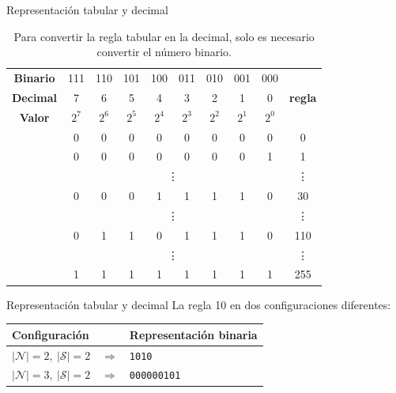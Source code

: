 \begin{frame}{Representación tabular y decimal}
	
	
	\begin{table}
		
		\centering
		
		\begin{tabular}{c | c c c c c c c c | c} 
			
			\textbf{Binario} &111 & 110 & 101 & 100 & 011 & 010 & 001 & 000 & \multirow{3}{*}{\textbf{regla}} \\ 
			
			\textbf{Decimal} & 7 & 6 & 5 & 4 & 3 & 2 & 1 & 0 & \\ 
			
			\textbf{Valor} & $2^7$ & $2^6$ & $2^5$ & $2^4$ & $2^3$ & $2^2$ & $2^1$ & $2^0$ & \\ \hline
			
			& 0 &  0 &  0 &  0 &  0 &  0 &  0 &  0 & 0 \\
			
			& 0 &  0 &  0 &  0 &  0 &  0 &  0 &  1 & 1 \\
			
			& \multicolumn{8}{c|}{\vdots} & \vdots \\ 
			
			& 0 &  0 &  0 &  1 &  1 &  1 &  1 &  0 & 30 \\
			
			& \multicolumn{8}{c|}{\vdots} & \vdots \\ 
			
			& 0 &  1 &  1 &  0 &  1 &  1 &  1 &  0 & 110 \\
			
			& \multicolumn{8}{c|}{\vdots} & \vdots \\ 
			
			& 1 &  1 &  1 &  1 &  1 &  1 &  1 &  1 & 255 
			
		\end{tabular}
		
		\caption{Para convertir la regla tabular en la decimal, solo es necesario convertir el número binario.} 		
	\end{table}
\end{frame}

\begin{frame}{Representación tabular y decimal}
	\centering
	La regla 10 en dos configuraciones diferentes: \\ 
	\vspace{1cm}
	
	\begin{tabular}{l c l}
		\hline
		Configuración & & Representación binaria \\
		\hline
		$\lvert\mathcal{N}\rvert=2,\ \lvert\mathcal{S}\rvert=2$ & $\Rightarrow$ & \texttt{1010} \\
		$\lvert\mathcal{N}\rvert=3,\ \lvert\mathcal{S}\rvert=2$ & $\Rightarrow$ & \texttt{000000101} \\
		\hline
	\end{tabular}
\end{frame}

